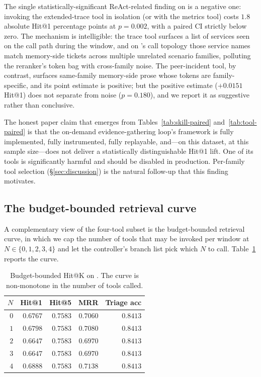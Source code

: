 The single statistically-significant ReAct-related finding on \dsob{} is a negative one: invoking the extended-trace tool in isolation (or with the metrics tool) costs $1.8$ absolute Hit@1 percentage points at $p = 0.002$, with a paired CI strictly below zero. The mechanism is intelligible: the trace tool surfaces a list of services seen on the call path during the window, and on \dsob{}'s call topology those service names match memory-side tickets across multiple unrelated scenario families, polluting the reranker's token bag with cross-family noise. The peer-incident tool, by contrast, surfaces same-family memory-side prose whose tokens are family-specific, and its point estimate is positive; but the positive estimate ($+0.0151$ Hit@1) does not separate from noise ($p = 0.180$), and we report it as suggestive rather than conclusive.

The honest paper claim that emerges from Tables~\ref{tab:skill-paired} and~\ref{tab:tool-paired} is that the on-demand evidence-gathering loop's framework is fully implemented, fully instrumented, fully replayable, and---on this dataset, at this sample size---does not deliver a statistically distinguishable Hit@1 lift. One of its tools is significantly harmful and should be disabled in production. Per-family tool selection (\S\ref{sec:discussion}) is the natural follow-up that this finding motivates.

\subsection{The budget-bounded retrieval curve}
\label{sec:results:budget}

A complementary view of the four-tool subset is the budget-bounded retrieval curve, in which we cap the number of tools that may be invoked per window at $N \in \{0, 1, 2, 3, 4\}$ and let the controller's branch list pick which $N$ to call. Table~\ref{tab:budget-ob} reports the curve.

\begin{table}[ht]
  \centering
  \caption{Budget-bounded Hit@K on \dsob{}. The curve is non-monotone in the number of tools called.}
  \label{tab:budget-ob}
  \small
  \begin{tabular}{rrrrr}
    \toprule
    $N$ & Hit@1 & Hit@5 & MRR & Triage acc \\
    \midrule
    $0$ & $0.6767$ & $0.7583$ & $0.7060$ & $0.8413$ \\
    $1$ & $0.6798$ & $0.7583$ & $0.7080$ & $0.8413$ \\
    $2$ & $\mathbf{0.6647}$ & $0.7583$ & $0.6970$ & $0.8413$ \\
    $3$ & $\mathbf{0.6647}$ & $0.7583$ & $0.6970$ & $0.8413$ \\
    $4$ & $0.6888$ & $0.7583$ & $0.7138$ & $0.8413$ \\
    \bottomrule
  \end{tabular}
\end{table}

